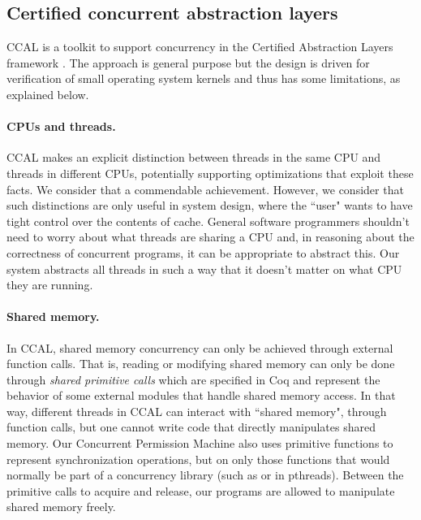 \subsection*{Certified concurrent abstraction layers} CCAL \cite{gu18:ccal} is a toolkit to support concurrency in the Certified Abstraction Layers framework \cite{Ronghui15abstractionlayers}. The approach is general purpose but the design is driven for verification of small operating system kernels and thus has some limitations, as explained below.  

\paragraph{CPUs and threads.} CCAL makes an explicit distinction between threads in the same CPU and threads in different CPUs, potentially supporting optimizations that exploit these facts. We consider that a commendable achievement. However, we consider that such distinctions are only useful in system design, where the ``user" wants to have tight control over the contents of cache. General software programmers shouldn't need to worry about what threads are sharing a CPU and, in reasoning about the correctness of concurrent programs, it can be appropriate to abstract this. Our system abstracts all threads in such a way that it doesn't matter on what CPU they are running.   


\paragraph{Shared memory.} In CCAL, shared memory concurrency can only be achieved through external function calls. That is, reading or modifying shared memory can only be done through \emph{shared primitive calls} which are specified in Coq and represent the behavior of some external modules that handle shared memory access. In that way, different threads in CCAL can interact with ``shared memory", through function calls, but one cannot write code that directly manipulates shared memory. Our Concurrent Permission Machine also uses primitive functions to represent synchronization operations, but on only those functions that would normally be part of a concurrency library (such as  or  in pthreads). Between the primitive calls to acquire and release, our programs are allowed to manipulate shared memory freely. 
 

